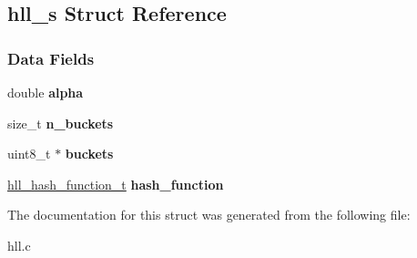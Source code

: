 \hypertarget{structhll__s}{}\subsection{hll\+\_\+s Struct Reference}
\label{structhll__s}
\subsubsection*{Data Fields}
\begin{DoxyCompactItemize}
\item 
\mbox{\label{structhll__s_a5b24831053600f820bfed2ec2fe3f045}} 
double {\bfseries alpha}
\item 
\mbox{\label{structhll__s_aea5f44ec6e0d4a5523c12ab903ddc69e}} 
size\+\_\+t {\bfseries n\+\_\+buckets}
\item 
\mbox{\label{structhll__s_a0991b26d77fcff7388e6f251ca0e1025}} 
uint8\+\_\+t $\ast$ {\bfseries buckets}
\item 
\mbox{\label{structhll__s_ac90d6c814a73bc480e7e6e84183267bf}} 
\hyperlink{hll_8h_a4810b852ed49962affc0136b06664f06}{hll\+\_\+hash\+\_\+function\+\_\+t} {\bfseries hash\+\_\+function}
\end{DoxyCompactItemize}


The documentation for this struct was generated from the following file\+:\begin{DoxyCompactItemize}
\item 
hll.\+c\end{DoxyCompactItemize}
